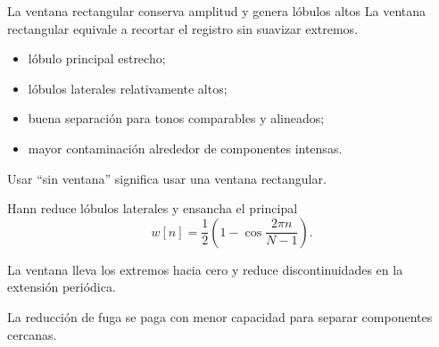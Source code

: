 \documentclass[
  ignorenonframetext,
  aspectratio=169,
  spanish,
]{beamer}
\providecommand{\faExclamation}{\faIcon{exclamation}}
\providecommand{\tightlist}{%
  \setlength{\itemsep}{0pt}\setlength{\parskip}{0pt}}
\begin{document}
\begin{frame}{La ventana rectangular conserva amplitud y genera lóbulos
    altos}
  \protect{}\label{la-ventana-rectangular-conserva-amplitud-y-genera-luxf3bulos-altos}
  La ventana rectangular equivale a recortar el registro sin suavizar
  extremos.

  \begin{itemize}
    \tightlist
    \item
          lóbulo principal estrecho;
    \item
          lóbulos laterales relativamente altos;
    \item
          buena separación para tonos comparables y alineados;
    \item
          mayor contaminación alrededor de componentes intensas.
  \end{itemize}

  \begin{tcolorbox}[enhanced jigsaw, arc=.35mm, bottomrule=.15mm, bottomtitle=1mm, breakable, colback=white, colbacktitle=quarto-callout-warning-color!10!white, colframe=quarto-callout-warning-color-frame, coltitle=black, left=2mm, leftrule=.75mm, opacityback=0, opacitybacktitle=0.6, rightrule=.15mm, title=\textcolor{quarto-callout-warning-color}{\faExclamationTriangle}\hspace{0.5em}{Advertencia}, titlerule=0mm, toprule=.15mm, toptitle=1mm]

    Usar ``sin ventana'' significa usar una ventana rectangular.

  \end{tcolorbox}
\end{frame}

\begin{frame}{Hann reduce lóbulos laterales y ensancha el principal}
  \protect{}\label{hann-reduce-luxf3bulos-laterales-y-ensancha-el-principal}
  \[w[n]=\frac{1}{2}\left(1-\cos\frac{2\pi n}{N-1}\right).\]

  La ventana lleva los extremos hacia cero y reduce discontinuidades en la
  extensión periódica.

  \begin{tcolorbox}[enhanced jigsaw, arc=.35mm, bottomrule=.15mm, bottomtitle=1mm, breakable, colback=white, colbacktitle=quarto-callout-important-color!10!white, colframe=quarto-callout-important-color-frame, coltitle=black, left=2mm, leftrule=.75mm, opacityback=0, opacitybacktitle=0.6, rightrule=.15mm, title=\textcolor{quarto-callout-important-color}{\faExclamation}\hspace{0.5em}{Importante}, titlerule=0mm, toprule=.15mm, toptitle=1mm]

    La reducción de fuga se paga con menor capacidad para separar
    componentes cercanas.

  \end{tcolorbox}
\end{frame}
\end{document}
